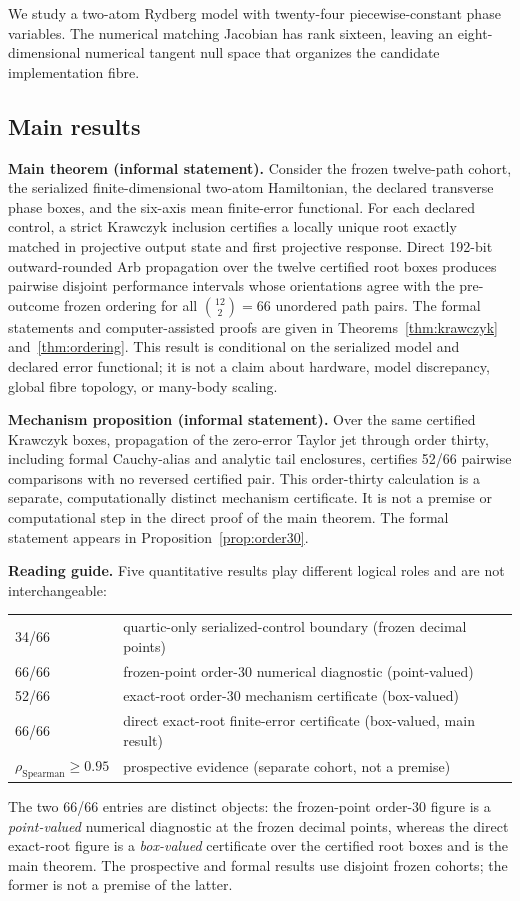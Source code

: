 We study a two-atom Rydberg model with twenty-four piecewise-constant phase variables. The
numerical matching Jacobian has rank sixteen, leaving an eight-dimensional numerical
tangent null space that organizes the candidate implementation fibre.

\subsection{Main results}

\textbf{Main theorem (informal statement).} Consider the frozen twelve-path cohort, the
serialized finite-dimensional two-atom Hamiltonian, the declared transverse phase boxes,
and the six-axis mean finite-error functional. For each declared control, a strict Krawczyk
inclusion certifies a locally unique root exactly matched in projective output state and
first projective response. Direct 192-bit outward-rounded Arb propagation over the twelve
certified root boxes produces pairwise disjoint performance intervals whose orientations
agree with the pre-outcome frozen ordering for all $\binom{12}{2}=66$ unordered path pairs.
The formal statements and computer-assisted proofs are given in Theorems~\ref{thm:krawczyk}
and~\ref{thm:ordering}. This result is conditional on the serialized model and declared
error functional; it is not a claim about hardware, model discrepancy, global fibre
topology, or many-body scaling.

\textbf{Mechanism proposition (informal statement).} Over the same certified Krawczyk
boxes, propagation of the zero-error Taylor jet through order thirty, including formal
Cauchy-alias and analytic tail enclosures, certifies 52/66 pairwise comparisons with no
reversed certified pair. This order-thirty calculation is a separate, computationally
distinct mechanism certificate. It is not a premise or computational step in the direct
proof of the main theorem. The formal statement appears in
Proposition~\ref{prop:order30}.

\textbf{Reading guide.} Five quantitative results play different logical roles and are
not interchangeable:
\begin{center}
\begin{tabular}{ll}
34/66 & quartic-only serialized-control boundary (frozen decimal points)\\
66/66 & frozen-point order-30 numerical diagnostic (point-valued)\\
52/66 & exact-root order-30 mechanism certificate (box-valued)\\
66/66 & direct exact-root finite-error certificate (box-valued, main result)\\
$\rho_{\mathrm{Spearman}}\ge0.95$ & prospective evidence (separate cohort, not a premise)
\end{tabular}
\end{center}
The two 66/66 entries are distinct objects: the frozen-point order-30 figure is a
\emph{point-valued} numerical diagnostic at the frozen decimal points, whereas the direct
exact-root figure is a \emph{box-valued} certificate over the certified root boxes and is
the main theorem. The prospective and formal results use disjoint frozen cohorts; the
former is not a premise of the latter.

